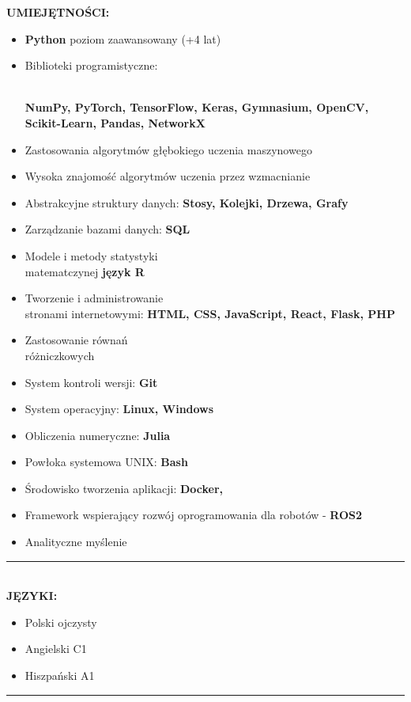 \documentclass[10pt]{article}
\begin{document}
\fontsize{14pt}{14pt}\selectfont \textbf{\color{Violet}UMIEJĘTNOŚCI:}
\fontsize{10pt}{10pt}\selectfont
\begin{itemize}[leftmargin=*]
    \item \textbf{Python} poziom zaawansowany (+4 lat)
    \item Biblioteki programistyczne: \raggedright \\ \textbf{NumPy, PyTorch, TensorFlow, Keras, Gymnasium, OpenCV, Scikit-Learn, Pandas, NetworkX}
    \item Zastosowania algorytmów głębokiego uczenia maszynowego
    \item Wysoka znajomość algorytmów uczenia przez wzmacnianie
    \item Abstrakcyjne struktury danych: \textbf{Stosy, Kolejki, Drzewa, Grafy}
    \item Zarządzanie bazami danych: \textbf{SQL}
    \item Modele i metody statystyki \\ matematczynej \textbf{język R}
    \item Tworzenie i administrowanie \\ stronami internetowymi: \textbf{HTML, CSS, JavaScript, React, Flask, PHP}
    \item Zastosowanie równań \\ różniczkowych
    \item System kontroli wersji: \textbf{Git}
    \item System operacyjny: \textbf{Linux, Windows}
    \item Obliczenia numeryczne: \textbf{Julia}
    \item Powłoka systemowa UNIX: \textbf{Bash} 
    \item Środowisko tworzenia aplikacji: \textbf{Docker,} 
    \item Framework wspierający rozwój oprogramowania dla robotów - \textbf{ROS2}
    \item Analityczne myślenie
\end{itemize}
\rule{17cm}{1pt} \\

\fontsize{14pt}{14pt}\selectfont \textbf{\color{Violet}JĘZYKI:}
\fontsize{10pt}{10pt}\selectfont
\begin{itemize}[leftmargin=*]
    \item Polski ojczysty
    \item Angielski C1
    \item Hiszpański A1
\end{itemize}
\rule{17cm}{1pt} \\
\end{document}
